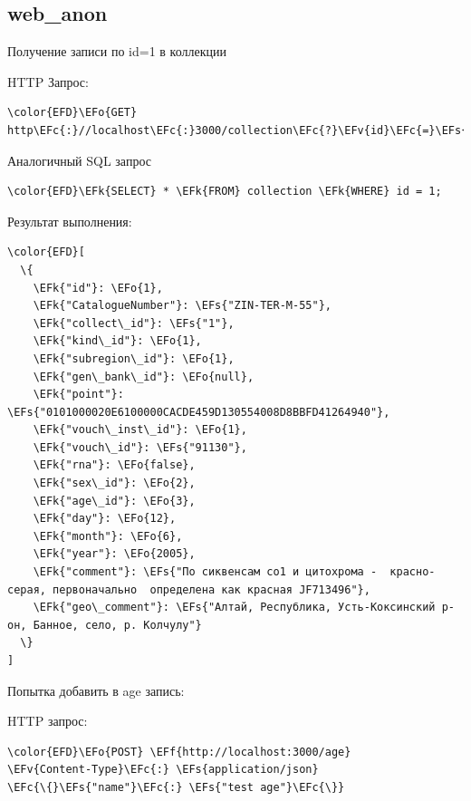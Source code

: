 \documentclass[14pt]{extarticle}
\newcommand{\EFc}[1]{\textcolor{EFc}{#1}} %
\newcommand{\EFs}[1]{\textcolor{EFs}{#1}} %
\newcommand{\EFk}[1]{\textcolor{EFk}{#1}} %
\newcommand{\EFf}[1]{\textcolor{EFf}{#1}} %
\newcommand{\EFv}[1]{\textcolor{EFv}{#1}} %
\newcommand{\EFo}[1]{\textcolor{EFo}{#1}} %
\begin{document}
\subsection{web\_​anon}
\label{sec:org2c745ff}

Получение записи по id=1 в коллекции

HTTP Запрос:
\begin{Code}
\begin{Verbatim}
\color{EFD}\EFo{GET} http\EFc{:}//localhost\EFc{:}3000/collection\EFc{?}\EFv{id}\EFc{=}\EFs{eq.1}
\end{Verbatim}
\end{Code}

Аналогичный SQL запрос
\begin{Code}
\begin{Verbatim}
\color{EFD}\EFk{SELECT} * \EFk{FROM} collection \EFk{WHERE} id = 1;
\end{Verbatim}
\end{Code}


Результат выполнения:
\begin{Code}
\begin{Verbatim}
\color{EFD}[
  \{
    \EFk{"id"}: \EFo{1},
    \EFk{"CatalogueNumber"}: \EFs{"ZIN-TER-M-55"},
    \EFk{"collect\_id"}: \EFs{"1"},
    \EFk{"kind\_id"}: \EFo{1},
    \EFk{"subregion\_id"}: \EFo{1},
    \EFk{"gen\_bank\_id"}: \EFo{null},
    \EFk{"point"}: \EFs{"0101000020E6100000CACDE459D130554008D8BBFD41264940"},
    \EFk{"vouch\_inst\_id"}: \EFo{1},
    \EFk{"vouch\_id"}: \EFs{"91130"},
    \EFk{"rna"}: \EFo{false},
    \EFk{"sex\_id"}: \EFo{2},
    \EFk{"age\_id"}: \EFo{3},
    \EFk{"day"}: \EFo{12},
    \EFk{"month"}: \EFo{6},
    \EFk{"year"}: \EFo{2005},
    \EFk{"comment"}: \EFs{"По сиквенсам со1 и цитохрома -  красно-серая, первоначально  определена как красная JF713496"},
    \EFk{"geo\_comment"}: \EFs{"Алтай, Республика, Усть-Коксинский р-он, Банное, село, р. Колчулу"}
  \}
]
\end{Verbatim}
\end{Code}

Попытка добавить в age запись:

HTTP запрос:
\begin{Code}
\begin{Verbatim}
\color{EFD}\EFo{POST} \EFf{http://localhost:3000/age}
\EFv{Content-Type}\EFc{:} \EFs{application/json}
\EFc{\{}\EFs{"name"}\EFc{:} \EFs{"test age"}\EFc{\}}
\end{Verbatim}
\end{Code}
\end{document}
